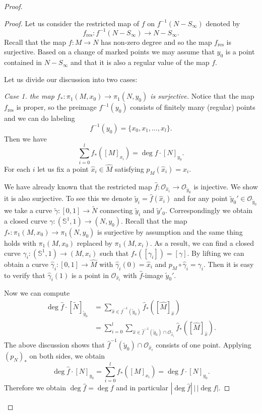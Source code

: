 \documentclass[11pt,letterpaper]{amsart}
\numberwithin{equation}{section}
\theoremstyle{definition}
\begin{document}
\begin{proof}
\begin{proof}
Let us consider the restricted map of $f$ on $f^{-1}(N-S_\infty)$ denoted by
$$
f_{\mathrm{res}}:f^{-1}(N-S_\infty)\to N-S_\infty.
$$
Recall that the map $f:M\to N$ has non-zero degree and so the map $f_{\mathrm{res}}$
is surjective. Based on a change of marked points we may assume that $y_0 $ is a point contained in $ N-S_\infty$ and that it is also a regular value of the map $f$.

Let us divide our discussion into two cases:

\medskip
{\it Case 1. the map $f_*:\pi_1(M,x_0)\to \pi_1(N,y_0)$ is surjective.} Notice that the map $f_{\mathrm{res}}$ is proper, so the preimage $f^{-1}(y_0)$ consists of finitely many (regular) points and we can do labeling
$$
f^{-1}(y_0)=\{x_0,x_1,\ldots,x_l\}.
$$
Then we have
$$
\sum_{i=0}^lf_*([M]_{x_i})=\deg f\cdot [N]_{y_0}.
$$
For each $i$ let us fix a point $\hat x_i\in\widehat M$ satisfying $p_M(\hat x_i)=x_i$.

We have already known that the restricted map $\hat f:\mathcal O_{\hat x_i}\to \mathcal O_{\tilde y_0}$ is injective. We show it is also surjective. To see this we denote $\tilde y_i=\hat f(\hat x_i)$ and for any point $\tilde y_0'\in\mathcal O_{\tilde{y}_0}$ we take a curve $\tilde \gamma:[0,1]\to \tilde N$ connecting $\tilde y_i$ and $\tilde y'_0$. Correspondingly we obtain a closed curve $\gamma:(\mathbb S^1,1)\to (N,y_0)$. Recall that the map $f_*: \pi_1(M,x_0)\to \pi_1(N,y_0)$ is surjective by assumption and the same thing holds with $\pi_1(M,x_0)$ replaced by $\pi_1(M,x_i)$. As a result, we can find a closed curve $\gamma_i:(\mathbb S^1,1)\to (M,x_i)$ such that $f_*([\gamma_i])=[\gamma]$. By lifting we can obtain a curve $\hat\gamma_i:[0,1]\to \widehat M$ with $\hat\gamma_i(0)=\hat x_i$ and $p_M\circ \hat\gamma_i=\gamma_i$. Then it is easy to verify that $\hat\gamma_i(1)$ is a point in $\mathcal O_{\hat x_i}$ with $\hat f$-image $\tilde y_0'$.

Now we can compute
\[
\begin{split}
\deg \hat f\cdot [\tilde N]_{\tilde y_0}&=\sum_{\hat x\in \hat f^{-1}(\tilde y_0)}\hat f_*([\widehat M]_{\hat x})\\
&=\sum_{i=0}^l\sum_{\hat x\in \hat f^{-1}(\tilde y_0)\cap \mathcal O_{\hat x_i}}\hat f_*([\widehat M]_{\hat x}).
\end{split}
\]
The above discussion shows that $\hat{f}^{-1}(\tilde{y}_{0})\cap\mathcal{O}_{\hat{x}_{i}}$ consists of one point. Applying $(p_{N})_{*}$ on both sides, we obtain
$$
\deg \hat f\cdot [N]_{y_0}=\sum_{i=0}^l f_*([M]_{x_i})=\deg f\cdot [N]_{y_0}.
$$
Therefore we obtain $\deg \hat f=\deg f$ and in particular $|\deg\hat f|\,\big |\,|\deg f|$.


\end{proof}
\end{proof}
\end{document}
